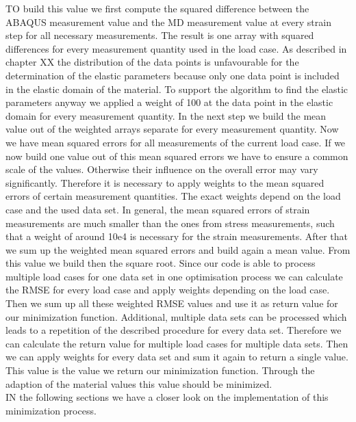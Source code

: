     TO build this value we first compute the squared difference between the ABAQUS measurement value and the MD measurement value at every strain step for all necessary measurements. The result is one array with squared differences for every measurement quantity used in the load case. As described in chapter XX the distribution of the data points is unfavourable for the determination of the elastic parameters because only one data point is included in the elastic domain of the material. To support the algorithm to find the elastic parameters anyway we applied a weight of 100 at the data point in the elastic domain for every measurement quantity. In the next step we build the mean value out of the weighted arrays separate for every measurement quantity. Now we have mean squared errors for all measurements of the current load case. If we now build one value out of this mean squared errors we have to ensure a common scale of the values. Otherwise their influence on the overall error may vary significantly. Therefore it is necessary to apply weights to the mean squared errors of certain measurement quantities. The exact weights depend on the load case and the used data set. In general, the mean squared errors of strain measurements are much smaller than the ones from stress measurements, such that a weight of around 10e4 is necessary for the strain measurements. After that we sum up the weighted mean squared errors and build again a mean value. From this value we build then the square root. Since our code is able to process multiple load cases for one data set in one optimisation process we can calculate the RMSE for every load case and apply weights depending on the load case. Then we sum up all these weighted RMSE values and use it as return value for our minimization function. Additional, multiple data sets can be processed which leads to a repetition of the described procedure for every data set. Therefore we can calculate the return value for multiple load cases for multiple data sets. Then we can apply weights for every data set and sum it again to return a single value. This value is the value we return our minimization function. Through the adaption of the material values this value should be minimized. \\
    IN the following sections we have a closer look on the implementation of this minimization process. 
